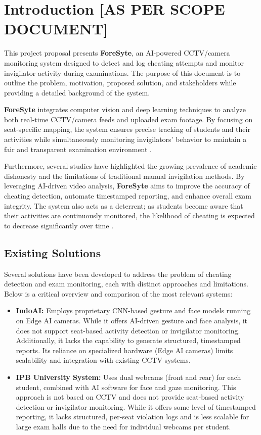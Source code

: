 \chapter{Introduction [AS PER SCOPE DOCUMENT]}
\label{sec:introduction}

This project proposal presents \textbf{ForeSyte}, an AI-powered CCTV/camera monitoring system designed to detect and log cheating attempts 
and monitor invigilator activity during examinations. The purpose of this document is to outline the problem, motivation, proposed 
solution, and stakeholders while providing a detailed background of the system.

\textbf{ForeSyte} integrates computer vision and deep learning techniques to analyze both real-time CCTV/camera feeds and uploaded exam footage. 
By focusing on seat-specific mapping, the system ensures precise tracking of students and their activities while simultaneously monitoring 
invigilators' behavior to maintain a fair and transparent examination environment \cite{bucciol2020cheating}. 

Furthermore, several studies have highlighted the growing prevalence of academic dishonesty and the limitations of traditional manual invigilation methods. 
By leveraging AI-driven video analysis, \textbf{ForeSyte} aims to improve the accuracy of cheating detection, automate timestamped reporting, 
and enhance overall exam integrity. The system also acts as a deterrent; as students become aware that their activities are continuously monitored, 
the likelihood of cheating is expected to decrease significantly over time \cite{examIntegrity2021}.


\section{Existing Solutions}

Several solutions have been developed to address the problem of cheating detection and exam monitoring, each with distinct approaches and limitations. Below is a critical overview and comparison of the most relevant systems:

\begin{itemize}
    \item \textbf{IndoAI:} Employs proprietary CNN-based gesture and face models running on Edge AI cameras. While it offers AI-driven gesture and face analysis, it does not support seat-based activity detection or invigilator monitoring. Additionally, it lacks the capability to generate structured, timestamped reports. Its reliance on specialized hardware (Edge AI cameras) limits scalability and integration with existing CCTV systems.
    
    \item \textbf{IPB University System:} Uses dual webcams (front and rear) for each student, combined with AI software for face and gaze monitoring. This approach is not based on CCTV and does not provide seat-based activity detection or invigilator monitoring. While it offers some level of timestamped reporting, it lacks structured, per-seat violation logs and is less scalable for large exam halls due to the need for individual webcams per student.
\end{itemize}

